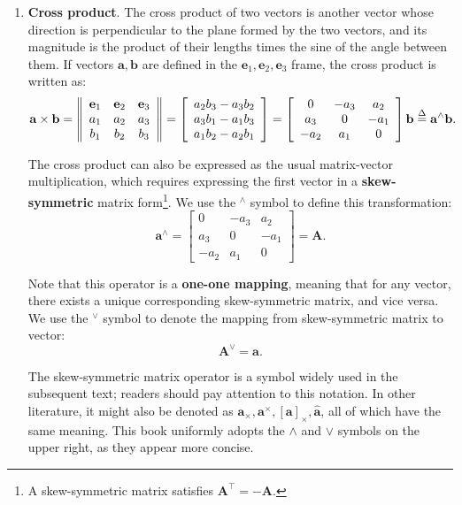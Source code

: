 \begin{enumerate}
	\item \textbf{Cross product}. The cross product of two vectors is another vector whose direction is perpendicular to the plane formed by the two vectors, and its magnitude is the product of their lengths times the sine of the angle between them. If vectors $\mathbf{a},\mathbf{b}$ are defined in the $\mathbf{e}_1, \mathbf{e}_2, \mathbf{e}_3$ frame, the cross product is written as:
	\begin{equation}
		\mathbf{a} \times \mathbf{b} = \left\| {\begin{array}{*{20}{c}}
				\mathbf{e}_1 & \mathbf{e}_2 & \mathbf{e}_3 \\
				{{a_1}}&{{a_2}}&{{a_3}}\\
				{{b_1}}&{{b_2}}&{{b_3}}
		\end{array}} \right\| = \left[ \begin{array}{l}
			{a_2}{b_3} - {a_3}{b_2}\\
			{a_3}{b_1} - {a_1}{b_3}\\
			{a_1}{b_2} - {a_2}{b_1}
		\end{array} \right] = \left[ {\begin{array}{*{20}{c}}
				0&{ - {a_3}}&{{a_2}}\\
				{{a_3}}&0&{ - {a_1}}\\
				{ - {a_2}}&{{a_1}}&0
		\end{array}} \right] \mathbf{b} \buildrel \Delta \over = { \mathbf{a}^ \wedge } \mathbf{b}.
	\end{equation}
	
	The cross product can also be expressed as the usual matrix-vector multiplication, which requires expressing the first vector in a \textbf{skew-symmetric} matrix form\footnote{A skew-symmetric matrix satisfies $\mathbf{A}^\top = -\mathbf{A}$.}. We use the $^\wedge$ symbol to define this transformation:
	\begin{equation}
		\mathbf{a}^\wedge = \left[ {\begin{array}{*{20}{c}}
				0&{ - {a_3}}&{{a_2}}\\
				{{a_3}}&0&{ - {a_1}}\\
				{ - {a_2}}&{{a_1}}&0
		\end{array}} \right] = \mathbf{A}.
	\end{equation}
		
	Note that this operator is a \textbf{one-one mapping}, meaning that for any vector, there exists a unique corresponding skew-symmetric matrix, and vice versa. We use the $^\vee$ symbol to denote the mapping from skew-symmetric matrix to vector:
	\begin{equation}
		\mathbf{A}^\vee = \mathbf{a}.
	\end{equation}
	
	The skew-symmetric matrix operator is a symbol widely used in the subsequent text; readers should pay attention to this notation. In other literature, it might also be denoted as $\mathbf{a}_\times, \mathbf{a}^\times, [\mathbf{a}]_\times, \hat{\mathbf{a}}$\cite{Qin2018}, all of which have the same meaning. This book uniformly adopts the $\wedge$ and $\vee$ symbols on the upper right, as they appear more concise.
\end{enumerate}
	
